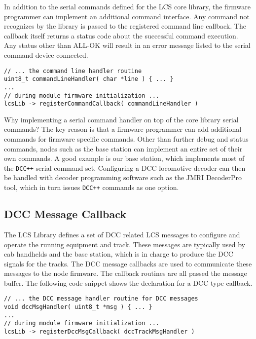 In addition to the serial commands defined for the LCS  core library, the firmware programmer can implement an additional command interface. Any command not recognizes by the library is passed to the registered command line callback. The callback itself returns a status code about the successful command execution. Any status other than ALL-OK will result in an error message listed to the serial command device connected.

\lstset{style=codesnippetstyle}
\begin{lstlisting}
// ... the command line handler routine
uint8_t commandLineHandler( char *line ) { ... }
...
// during module firmware initialization ...
lcsLib -> registerCommandCallback( commandLineHandler )
\end{lstlisting}

Why implementing a serial command handler on top of the core library serial commands? The key reason is that a firmware programmer can add additional commands for firmware specific commands. Other than further debug and status commands, nodes such as the base station can implement an entire set of their own commands. A good example is our base station, which implements most of the \texttt{DCC++} serial command set. Configuring a DCC locomotive decoder can then be handled with decoder programming software such as the JMRI DecoderPro tool, which in turn issues \texttt{DCC++} commands as one option.

\subsection{DCC Message Callback}

The LCS Library defines a set of DCC related LCS messages to configure and operate the running equipment and track. These messages are typically used by cab handhelds and the base station, which is in charge to produce the DCC signals for the tracks. The DCC message callbacks are used to communicate these messages to the node firmware. The callback routines are all passed the message buffer. The following code snippet shows the declaration for a DCC type callback.

\lstset{style=codesnippetstyle}
\begin{lstlisting}
// ... the DCC message handler routine for DCC messages
void dccMsgHandler( uint8_t *msg ) { ... }
...
// during module firmware initialization ...
lcsLib -> registerDccMsgCallback( dccTrackMsgHandler )
\end{lstlisting}

